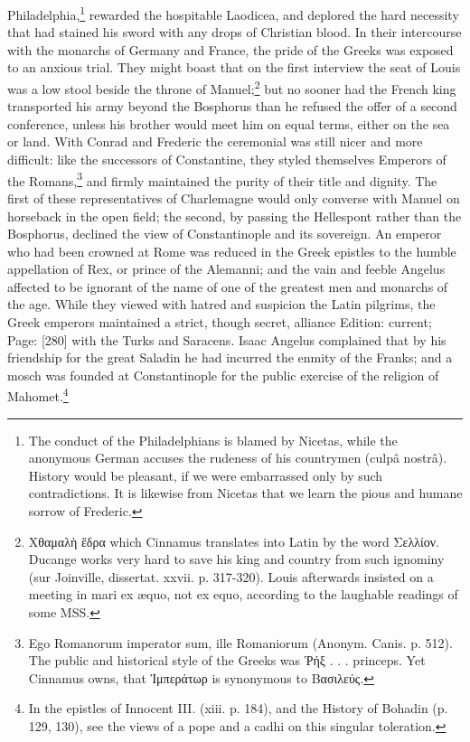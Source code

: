 Philadelphia,\footnote{The conduct of the Philadelphians is blamed by Nicetas, while the anonymous German accuses the rudeness of his countrymen (culpâ nostrâ). History would be pleasant, if we were embarrassed only by such contradictions. It is likewise from Nicetas that we learn the pious and humane sorrow of Frederic.} rewarded the hospitable Laodicea, and deplored the hard necessity that had stained his sword with any drops of Christian blood. In their intercourse with the monarchs of Germany and France, the pride of the Greeks was exposed to an anxious trial. They might boast that on the first interview the seat of Louis was a low stool beside the throne of Manuel;\footnote{\textgreek{Χθαμαλ\texthebrew{ὴ ἕ}δρα} which Cinnamus translates into Latin by the word \textgreek{Σελλίον}. Ducange works very hard to save his king and country from such ignominy (sur Joinville, dissertat. xxvii. p. 317-320). Louis afterwards insisted on a meeting in mari ex æquo, not ex equo, according to the laughable readings of some MSS.} but no sooner had the French king transported his army beyond the Bosphorus than he refused the offer of a second conference, unless his brother would meet him on equal terms, either on the sea or land. With Conrad and Frederic the ceremonial was still nicer and more difficult: like the successors of Constantine, they styled themselves Emperors of the Romans,\footnote{Ego Romanorum imperator sum, ille Romaniorum (Anonym. Canis. p. 512). The public and historical style of the Greeks was \textgreek{\texthebrew{Ῥ}ήξ} . . . princeps. Yet Cinnamus owns, that \textgreek{\texthebrew{Ἰ}μπεράτωρ} is synonymous to \textgreek{Βασιλεύς}.} and firmly maintained the purity of their title and dignity. The first of these representatives of Charlemagne would only converse with Manuel on horseback in the open field; the second, by passing the Hellespont rather than the Bosphorus, declined the view of Constantinople and its sovereign. An emperor who had been crowned at Rome was reduced in the Greek epistles to the humble appellation of Rex, or prince of the Alemanni; and the vain and feeble Angelus affected to be ignorant of the name of one of the greatest men and monarchs of the age. While they viewed with hatred and suspicion the Latin pilgrims, the Greek emperors maintained a strict, though secret, alliance Edition: current; Page: [280] with the Turks and Saracens. Isaac Angelus complained that by his friendship for the great Saladin he had incurred the enmity of the Franks; and a mosch was founded at Constantinople for the public exercise of the religion of Mahomet.\footnote{In the epistles of Innocent III. (xiii. p. 184), and the History of Bohadin (p. 129, 130), see the views of a pope and a cadhi on this singular toleration.}

